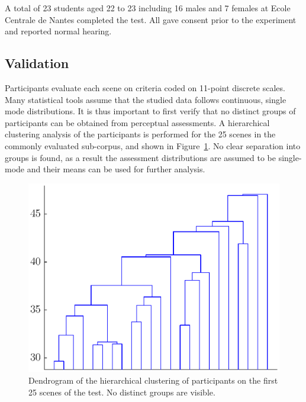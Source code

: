 \documentclass[11pt,a4paper]{article}
\begin{document}
A total of 23 students aged 22 to 23 including 16 males and 7 females at Ecole Centrale de Nantes completed the test. All gave consent prior to the experiment and reported normal hearing.

\subsection{Validation}
\label{sec:data_val}

Participants evaluate each scene on criteria coded on 11-point discrete scales. Many statistical tools assume that the studied data follows continuous, single mode distributions. It is thus important to first verify that no distinct groups of participants can be obtained from perceptual assessments. A hierarchical clustering analysis of the participants is performed for the 25 scenes in the commonly evaluated sub-corpus, and shown in Figure~\ref{fig:hclusters}. No clear separation into groups is found, as a result the assessment distributions are assumed to be single-mode and their means can be used for further analysis.\\

\begin{figure}[!h]
    \centering
    \includegraphics[width=\textwidth]{figures/subj_gr.eps}
    \caption{Dendrogram of the hierarchical clustering of participants on the first 25 scenes of the test. No distinct groups are visible.}\label{fig:hclusters}
\end{figure}
\end{document}
